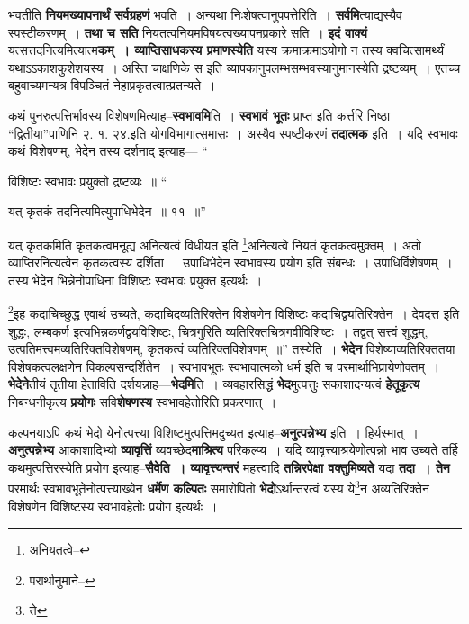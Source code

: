 \documentclass[article,12pt,a4paper]{memoir}
\begin{document}
	  \endgroup
	

	  \pstart भवतीति \textbf{नियमख्यापनार्थं सर्वग्रहणं} भवति । अन्यथा निःशेषत्वानुपपत्तेरिति । \textbf{सर्वमि}त्याद्यस्यैव स्पस्टीकरणम् । \textbf{तथा च सति} नियतत्वनियमविषयत्वख्यापनप्रकारे सति । \textbf{इदं वाक्यं} यत्सत्तदनित्यमित्यात्म\textbf{कम् । व्याप्तिसाधकस्य प्रमाणस्येति} यस्य क्रमाक्रमाऽयोगो न तस्य क्वचित्सामर्थ्यं यथाऽऽकाशकुशेशयस्य । अस्ति चाक्षणिके स इति व्यापकानुपलम्भसम्भवस्यानुमानस्येति द्रष्टव्यम् । एतच्च बहुवाच्यमन्यत्र विपञ्चितं नेहाप्रकृतत्वात्प्रतन्यते ।
	\pend
      

	  \pstart कथं पुनरुत्पत्तिर्भावस्य विशेषणमित्याह--\textbf{स्वभावमि}ति । \textbf{स्वभावं भूतः} प्राप्त इति कर्त्तरि निष्ठा “द्वितीया”\href{http://http://sarit.indology.info/?cref=Pā.2.1.24}{पाणिनि २. १. २४.}इति योगविभागा\leavevmode{}त्समासः । अस्यैव स्पष्टीकरणं \textbf{तदात्मक} इति । यदि स्वभावः कथं विशेषणम्, भेदेन तस्य दर्शनाद् इत्याह—  \leavevmode{} “
	  
	विशिष्टः स्वभावः प्रयुक्तो द्रष्टव्यः ॥ “
	  
	यत् कृतकं तदनित्यमित्युपाधिभेदेन ॥ ११ ॥” 
	  
	यत् कृतकमिति कृतकत्वमनूद्य अनित्यत्वं विधीयत इति \footnote{अनियतत्वे--\cite{dp-msA}}\-अनित्यत्वे नियतं कृतकत्वमुक्तम् । अतो व्याप्तिरनित्यत्वेन कृतकत्वस्य दर्शिता । उपाधिभेदेन स्वभावस्य प्रयोग इति संबन्धः । उपाधिर्विशेषणम् । तस्य भेदेन भिन्नेनोपाधिना विशिष्टः स्वभावः प्रयुक्त इत्यर्थः । 
	  
	\footnote{परार्थानुमाने--\cite{dp-msD-n}}\-इह कदाचिच्छुद्ध एवार्थ उच्यते, कदाचिदव्यतिरिक्तेन विशेषणेन विशिष्टः कदाचिद्व्यतिरिक्तेन । देवदत्त इति शुद्धः, लम्बकर्ण इत्यभिन्नकर्णद्वयविशिष्टः, चित्रगुरिति व्यतिरिक्तचित्रगवीविशिष्टः । तद्वत् सत्त्वं शुद्धम्, उत्पतिमत्त्वमव्यतिरिक्तविशेषणम्, कृतकत्वं व्यतिरिक्तविशेषणम् ॥” तस्येति । \textbf{भेदेन} विशेष्याव्यतिरिक्ततया विशेषकत्वलक्षणेन विकल्पसन्दर्शितेन । स्वभावभूतः स्वभावात्मको धर्म इति च परमार्थाभिप्रायेणोक्तम् । \textbf{भेदेने}तीयं तृतीया हेताविति दर्शयन्नाह—\textbf{भेदमि}ति । व्यवहारसिद्धं \textbf{भेद}मुत्पत्तुः सकाशादन्यत्वं \textbf{हेतूकृत्य} निबन्धनीकृत्य \textbf{प्रयोगः} सवि\textbf{शेषणस्य} स्वभावहेतोरिति प्रकरणात् ।
	\pend
      

	  \pstart कल्पनयाऽपि कथं भेदो येनोत्पत्त्या विशिष्टमुत्पत्तिमदुच्यत इत्याह--\textbf{अनुत्पन्नेभ्य} इति । हिर्यस्मात् । \textbf{अनुत्पन्नेभ्य} आकाशादिभ्यो \textbf{व्यावृत्तिं} व्यवच्छेद\textbf{माश्रित्य} परिकल्प्य । यदि व्यावृत्त्याश्रयेणोत्पन्नो भाव उच्यते तर्हि कथमुत्पत्तिरस्येति प्रयोग इत्याह--\textbf{सैवेति । व्यावृत्त्यन्तरं} महत्त्वादि \textbf{तन्निरपेक्षा वक्तुमिष्यते} यदा \textbf{तदा । तेन} परमार्थः स्वभावभूतेनोत्पत्त्याख्येन \textbf{धर्मेण कल्पितः} समारोपितो \textbf{भेदो}ऽर्थान्तरत्वं यस्य ये\footnote{ते}\-न अव्यतिरिक्तेन विशेषणेन विशिष्टस्य स्वभावहेतोः प्रयोग इत्यर्थः ।
	\pend
      
\end{document}
